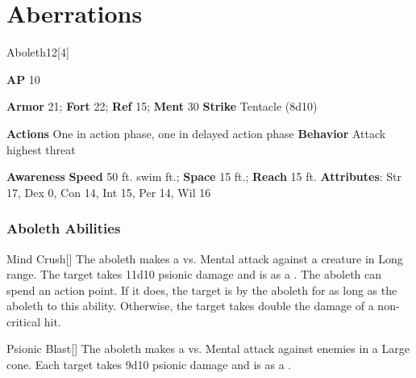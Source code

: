 
\section{Aberrations}
\begin{monsection}{Aboleth}{12}[4]
\vspace{-1em}\vspace{-1em}
\begin{spellcontent}
\begin{spelltargetinginfo}
{\textbf{AP} 10}

\pari \textbf{Armor} 21;
\textbf{Fort} 22;
\textbf{Ref} 15;
\textbf{Ment} 30
\pari \textbf{Strike} Tentacle  (8d10)


\pari \textbf{Actions} One in action phase, one in delayed action phase
\pari \textbf{Behavior} Attack highest threat
\end{spelltargetinginfo}
\end{spellcontent}

\begin{monsterfooter}
\pari \textbf{Awareness} 
\pari \textbf{Speed} 50 ft. swim ft.;
\textbf{Space} 15 ft.;
\textbf{Reach} 15 ft.
\pari \textbf{Attributes}:
Str 17,
Dex 0,
Con 14,
Int 15,
Per 14,
Wil 16
\end{monsterfooter}
\end{monsection}


\subsubsection{Aboleth Abilities}

\begin{freeability}{Mind Crush}[]
The aboleth makes a  vs. Mental attack against a creature in Long range.
\hit The target takes 11d10 psionic damage and is  as a .
\crit The aboleth can spend an action point.
If it does, the target is  by the aboleth for as long as the aboleth  to this ability.
Otherwise, the target takes double the damage of a non-critical hit.
\end{freeability}

\vspace{0.5em}
\begin{freeability}{Psionic Blast}[]
The aboleth makes a  vs. Mental attack against enemies in a Large cone.
\hit Each target takes 9d10 psionic damage and is  as a .
\end{freeability}

